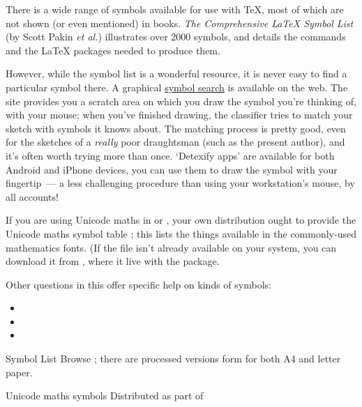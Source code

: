
There is a wide range of symbols available for use with \TeX{}, most
of which are not shown (or even mentioned) in \AllTeX{} books.
\emph{The Comprehensive \LaTeX{} Symbol List} (by Scott Pakin
\emph{et al.}\@) illustrates over 2000 symbols, and details the
commands and the \LaTeX{} packages needed to produce them.

However, while the symbol list is a wonderful resource, it is never
easy to find a particular symbol there.  A graphical %
\href{http://detexify.kirelabs.org/classify.html}{symbol search} is
available on the web.  The site provides you a scratch area on which
you draw the symbol you're thinking of, with your mouse; when you've
finished drawing, the classifier tries to match your sketch with
symbols it knows about.  The matching process is pretty good, even for
the sketches of a \emph{really} poor draughtsman (such as the present
author), and it's often worth trying more than once.  `Detexify apps'
are available for both Android and iPhone devices, you can use them to
draw the symbol with your fingertip~--- a less challenging procedure
than using your workstation's mouse, by all accounts!

If you are using Unicode maths in \xetex{} or \LuaTeX{}, your own
distribution ought to provide the Unicode maths symbol table
; this lists the things available in the
commonly-used mathematics fonts.  (If the file isn't already available
on your system, you can download it from , where it live
with the  package.

Other questions in this  offer specific help on kinds of
symbols:
\begin{itemize}
\item {}
\item {}
\item {}
\end{itemize}
\begin{ctanrefs}
\item[\nothtml{\rmfamily}Symbol List]Browse ; there
  are processed versions  form for both A4 and letter paper.
\item[\nothtml{\rmfamily}Unicode maths symbols]Distributed as part of
\end{ctanrefs}

